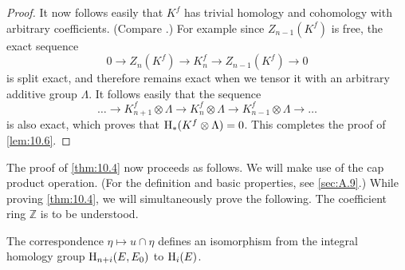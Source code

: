 \documentclass[../main]{subfiles}
\begin{document}
\begin{proof}
It now follows easily that $K^f$ has trivial homology and cohomology with arbitrary coefficients. (Compare \cite[pp. 167]{spanier1981}.) For example since $Z_{n - 1}(K^f)$ is free, the exact sequence \[0 \longrightarrow Z_n(K^f) \longrightarrow K_n^f \longrightarrow Z_{n - 1}(K^f) \longrightarrow 0\] is split exact, and therefore remains exact when we tensor it with an arbitrary additive group $\Lambda$. It follows easily that the sequence \[\ldots \longrightarrow K_{n + 1}^f \otimes \Lambda \longrightarrow K_n^f \otimes \Lambda \longrightarrow K_{n - 1}^f \otimes \Lambda \longrightarrow \ldots\] is also exact, which proves that $\operatorname{H}_\ast(K^f \otimes \Lambda) = 0$. This completes the proof of \ref{lem:10.6}. 
\end{proof}

The proof of \ref{thm:10.4} now proceeds as follows. We will make use of the cap product operation. (For the definition and basic properties, see \ref{sec:A.9}.) While proving \ref{thm:10.4}, we will simultaneously prove the following. The coefficient ring $\mathbb Z$ is to be understood. 

\begin{corollary}
\label{cor:10.7}
The correspondence $\eta \mapsto u \cap \eta$ defines an isomorphism from the integral homology group $\operatorname{H}_{n + i}(E, E_0)$ to $\operatorname{H}_i(E)$. 
\end{corollary}
\end{document}
